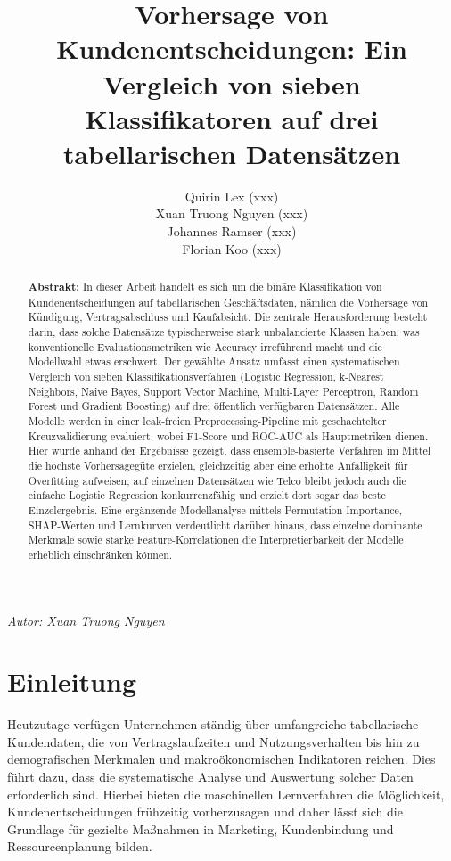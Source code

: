 \documentclass[10pt]{scrartcl}
\begin{document}
\title{\LARGE Vorhersage von Kundenentscheidungen: Ein Vergleich von sieben Klassifikatoren auf drei tabellarischen Datensätzen}
\author{
	Quirin Lex (xxx)\\
	Xuan Truong Nguyen (xxx)\\
	Johannes Ramser (xxx)\\
	Florian Koo (xxx)
}
\date{}
\maketitle

\tableofcontents
\newpage

\begin{abstract}
\noindent
\textbf{Abstrakt:}
In dieser Arbeit handelt es sich um die binäre Klassifikation von Kundenentscheidungen auf tabellarischen Geschäftsdaten, nämlich die Vorhersage von Kündigung, Vertragsabschluss und Kaufabsicht. Die zentrale Herausforderung besteht darin, dass solche Datensätze typischerweise stark unbalancierte Klassen haben, was konventionelle Evaluationsmetriken wie Accuracy irreführend macht und die Modellwahl 
etwas erschwert. Der gewählte Ansatz umfasst einen systematischen Vergleich von sieben Klassifikationsverfahren (Logistic Regression, k-Nearest Neighbors, Naive Bayes, Support Vector Machine, Multi-Layer Perceptron, Random Forest und Gradient Boosting) auf drei öffentlich verfügbaren Datensätzen. Alle Modelle werden in einer leak-freien Preprocessing-Pipeline mit geschachtelter 
Kreuzvalidierung evaluiert, wobei F1-Score und ROC-AUC als Hauptmetriken dienen. Hier wurde anhand der Ergebnisse gezeigt, dass ensemble-basierte Verfahren im Mittel die höchste Vorhersagegüte erzielen, gleichzeitig aber eine erhöhte Anfälligkeit für Overfitting aufweisen; auf einzelnen Datensätzen wie Telco bleibt jedoch auch die einfache Logistic Regression konkurrenzfähig und erzielt dort sogar das beste Einzelergebnis. Eine ergänzende Modellanalyse mittels Permutation Importance, SHAP-Werten und Lernkurven verdeutlicht darüber hinaus, dass 
einzelne dominante Merkmale sowie starke Feature-Korrelationen die Interpretierbarkeit der Modelle erheblich einschränken können.
\end{abstract}

\begin{flushright}\textit{Autor: Xuan Truong Nguyen}\end{flushright}


\section{Einleitung}
Heutzutage verfügen Unternehmen ständig über umfangreiche tabellarische Kundendaten, die von Vertragslaufzeiten und Nutzungsverhalten bis hin zu demografischen Merkmalen und makroökonomischen Indikatoren reichen. Dies führt dazu, dass die systematische Analyse und Auswertung solcher Daten erforderlich sind. Hierbei bieten die maschinellen Lernverfahren die Möglichkeit, Kundenentscheidungen frühzeitig 
vorherzusagen und daher lässt sich die Grundlage für gezielte Maßnahmen in Marketing, Kundenbindung und Ressourcenplanung bilden.
\end{document}
